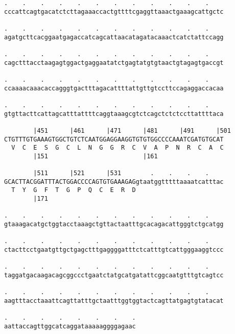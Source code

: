 \documentclass{article}
\begin{document}
\begin{Verbatim}
.    .    .    .    .    .    .    .    .    .    .    .    
cccattcagtgacatctcttagaaaccactgttttcgaggttaaactgaaagcattgctc
                                                            
.    .    .    .    .    .    .    .    .    .    .    .    
agatgcttcacggaatgagaccatcagcattaacatagatacaaactcatctattccagg
                                                            
.    .    .    .    .    .    .    .    .    .    .    .    
cagctttacctaagagtggactgaggaatatctgagtatgtgtaactgtagagtgaccgt
                                                            
.    .    .    .    .    .    .    .    .    .    .    .    
ccaaaacaaacaccagggtgactttagacattttattgttgtccttccagaggaccacaa
                                                            
.    .    .    .    .    .    .    .    .    .    .    .    
gtgttacttcattagcatttattttcaggtaaagcgtctcagctctctccttattttaca
                                                            
        |451      |461      |471      |481      |491      |501
CTGTTTGTGAAAGTGGCTGTCTCAATGGAGGAAGGTGTGTGGCCCCAAATCGATGTGCAT
  V  C  E  S  G  C  L  N  G  G  R  C  V  A  P  N  R  C  A  C
        |151                          |161                  
  
        |511      |521      |531        .    .    .    .    
GCACTTACGGATTTACTGGACCCCAGTGTGAAAGAGgtaatggtttttaaaatcatttac
  T  Y  G  F  T  G  P  Q  C  E  R  D                        
        |171                                                
  
.    .    .    .    .    .    .    .    .    .    .    .    
gtaaagacatgctggtacctaaagctgttactaatttgcacagacattgggtctgcatgg
                                                            
.    .    .    .    .    .    .    .    .    .    .    .    
ctacttcctgaatgttgctgagctttgaggggatttctcatttgtcattgggaaggtccc
                                                            
.    .    .    .    .    .    .    .    .    .    .    .    
taggatgacaagacagcggccctgaatctatgcatgatattcggcaatgtttgtcagtcc
                                                            
.    .    .    .    .    .    .    .    .    .    .    .    
aagtttacctaaattcagttatttgctaatttggtggtactcagttatgagtgtatacat
                                                            
.    .    .    .    .    .    .    .
aattaccagttggcatcaggataaaaaggggagaac
                                    

\end{Verbatim}
\end{document}
